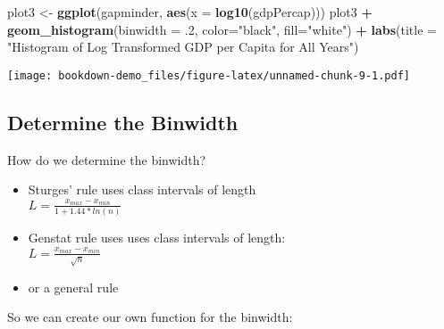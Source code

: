 \documentclass[
]{book}
\newenvironment{Shaded}{\begin{snugshade}}{\end{snugshade}}
\newcommand{\ControlFlowTok}[1]{\textcolor[rgb]{0.13,0.29,0.53}{\textbf{#1}}}
\newcommand{\DataTypeTok}[1]{\textcolor[rgb]{0.13,0.29,0.53}{#1}}
\newcommand{\FloatTok}[1]{\textcolor[rgb]{0.00,0.00,0.81}{#1}}
\newcommand{\KeywordTok}[1]{\textcolor[rgb]{0.13,0.29,0.53}{\textbf{#1}}}
\newcommand{\NormalTok}[1]{#1}
\newcommand{\OperatorTok}[1]{\textcolor[rgb]{0.81,0.36,0.00}{\textbf{#1}}}
\newcommand{\StringTok}[1]{\textcolor[rgb]{0.31,0.60,0.02}{#1}}
\begin{document}
\begin{Shaded}
\begin{Highlighting}[]
\NormalTok{plot3 <-}\StringTok{ }\KeywordTok{ggplot}\NormalTok{(gapminder,}
                \KeywordTok{aes}\NormalTok{(}\DataTypeTok{x =} \KeywordTok{log10}\NormalTok{(gdpPercap)))}
\NormalTok{plot3 }\OperatorTok{+}\StringTok{ }
\StringTok{  }\KeywordTok{geom_histogram}\NormalTok{(}\DataTypeTok{binwidth =} \FloatTok{.2}\NormalTok{, }\DataTypeTok{color=}\StringTok{"black"}\NormalTok{, }\DataTypeTok{fill=}\StringTok{"white"}\NormalTok{) }\OperatorTok{+}
\StringTok{  }\KeywordTok{labs}\NormalTok{(}\DataTypeTok{title =} \StringTok{"Histogram of  Log Transformed GDP per Capita for All Years"}\NormalTok{)}
\end{Highlighting}
\end{Shaded}

\texttt{[image: bookdown-demo\_files/figure-latex/unnamed-chunk-9-1.pdf]}

\hypertarget{determine-the-binwidth}{%
\subsection{Determine the Binwidth}\label{determine-the-binwidth}}

How do we determine the binwidth?

\begin{itemize}
\item Sturges' rule uses class intervals of length \\
$L = \frac{x_{max}-x_{min}}{1+1.44*ln(n)}$ \\
\item Genstat rule uses uses class intervals of length: \\
$L = \frac{x_{max}-x_{min}}{\sqrt{n}}$ \\
\item or a general rule
\end{itemize}

So we can create our own function for the binwidth:

\begin{Shaded}
\end{Shaded}
\end{document}
